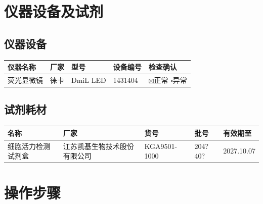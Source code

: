 \documentclass[UTF8,10pt,a4paper,fontset=fandol]{ctexart}
\newcommand{\fieldvalue}[1]{#1}
\newcommand{\handwritten}[1]{#1}
\begin{document}
\section{仪器设备及试剂}

\subsection{仪器设备}

\begin{tabularx}{\textwidth}{|X|X|X|X|X|}
\hline
仪器名称 & 厂家 & 型号 & 设备编号 & 检查确认 \\ \hline
\fieldvalue{荧光显微镜} &
\fieldvalue{徕卡} &
\fieldvalue{DmiL LED} &
\fieldvalue{1431404} &
\fieldvalue{\(\boxtimes\)正常 \(\square\)异常}
\\ \hline
\end{tabularx}

\subsection{试剂耗材}

\begin{tabularx}{\textwidth}{|X|X|X|X|X|}
\hline
名称 & 厂家 & 货号 & 批号 & 有效期至 \\ \hline
\fieldvalue{细胞活力检测试剂盒} &
\fieldvalue{江苏凯基生物技术股份有限公司} &
\fieldvalue{KGA9501-1000} &
\fieldvalue{\handwritten{204?40?}} &
\fieldvalue{\handwritten{2027.10.07}}
\\ \hline
\end{tabularx}

\section{操作步骤}
\end{document}
